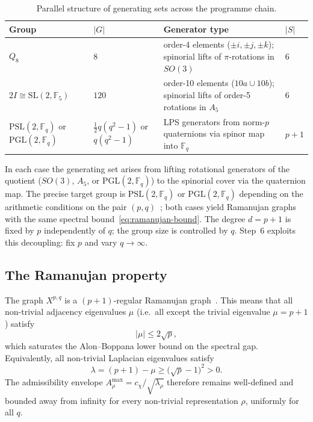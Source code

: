     \begin{table}[h]
      \centering
      \renewcommand{\arraystretch}{1.3}
      \caption{Parallel structure of generating sets across the programme chain.}
      \label{tab:gensets}
      \begin{tabular}{llll}
        \hline
        Group & $|G|$ & Generator type & $|S|$ \\
        \hline
        $Q_8$ & $8$ &
        order-4 elements ($\pm i,\pm j,\pm k$);
        spinorial lifts of $\pi$-rotations in $SO(3)$ & $6$ \\
        $2I \cong \mathrm{SL}(2,\mathbb{F}_5)$ & $120$ &
        order-10 elements ($10a \cup 10b$);
        spinorial lifts of order-5 rotations in $A_5$ & $6$ \\
        $\mathrm{PSL}(2,\mathbb{F}_q)$ or $\mathrm{PGL}(2,\mathbb{F}_q)$ &
        $\tfrac{1}{2}q(q^2{-}1)$ or $q(q^2{-}1)$ &
        LPS generators from norm-$p$ quaternions
        via spinor map into $\mathbb{F}_q$ & $p{+}1$ \\
        \hline
      \end{tabular}
    \end{table}

    In each case the generating set arises from lifting rotational generators
    of the quotient ($SO(3)$, $A_5$, or $\mathrm{PGL}(2,\mathbb{F}_q)$) to
    the spinorial cover via the quaternion map.
    The precise target group is $\mathrm{PSL}(2,\mathbb{F}_q)$ or
    $\mathrm{PGL}(2,\mathbb{F}_q)$ depending on the arithmetic conditions on
    the pair $(p,q)$~\cite{LPS1988}; both cases yield Ramanujan graphs with
    the same spectral bound~\eqref{eq:ramanujan-bound}.
    The degree $d = p+1$ is fixed by $p$ independently of $q$; the group size
    is controlled by $q$.
    Step~6 exploits this decoupling: fix $p$ and vary $q \to \infty$.

  \subsection{The Ramanujan property}
    \label{sec:step6a-ramanujan}

    The graph $X^{p,q}$ is a $(p+1)$-regular Ramanujan graph~\cite{LPS1988}.
    This means that all non-trivial adjacency eigenvalues $\mu$
    (i.e.\ all except the trivial eigenvalue $\mu = p+1$) satisfy
    \begin{equation}
      |\mu| \leq 2\sqrt{p},
      \label{eq:ramanujan-bound}
    \end{equation}
    which saturates the Alon--Boppana lower bound on the spectral gap.
    Equivalently, all non-trivial Laplacian eigenvalues satisfy
    \begin{equation}
      \lambda = (p+1) - \mu \geq \bigl(\sqrt{p} - 1\bigr)^2 > 0.
      \label{eq:ramanujan-gap}
    \end{equation}
    The admissibility envelope $A^{\max}_\rho = c_\chi/\sqrt{\lambda_\rho}$
    therefore remains well-defined and bounded away from infinity for every
    non-trivial representation $\rho$, uniformly for all $q$.


